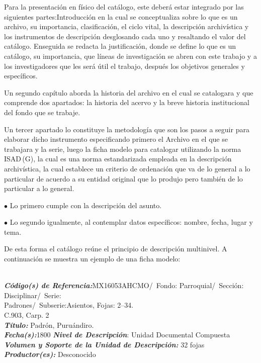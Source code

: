 Para la presentación en físico del catálogo, este deberá estar 
integrado por las siguientes partes:Introducción en la cual se 
conceptualiza sobre lo que es un archivo, su importancia, 
clasificación, el ciclo vital, la descripción archivística y los 
instrumentos de descripción desglosando cada uno y resaltando el valor 
del catálogo. Enseguida se redacta la justificación, donde se define lo 
que es un catálogo, su importancia, que líneas de investigación se 
abren con este trabajo y a los investigadores que les será útil el 
trabajo, después los objetivos generales y específicos.

\enlargethispage{1\baselineskip}
Un segundo capítulo aborda la historia del archivo en el cual se 
catalogara y que comprende dos apartados: la historia del 
acervo y la breve historia institucional del fondo que se trabaje.

Un tercer apartado lo constituye la metodología que son los pasos a 
seguir para elaborar dicho instrumento especificando primero el Archivo 
en el que se trabajara y la serie, luego la ficha modelo para catalogar 
utilizando la norma ISAD\,(G), la cual es una norma estandarizada empleada 
en la descripción archivística, la cual establece un criterio de 
ordenación que va de lo general a lo particular de acuerdo a su entidad 
original que lo produjo pero también de lo particular a lo general. 

\begin{Obs}
\item[$\bullet$]{Lo primero cumple con la descripción del asunto.}
\item[$\bullet$]{Lo segundo igualmente, al contemplar datos específicos: nombre, 
fecha, lugar y tema.}
\end{Obs}

De esta forma el catálogo reúne el principio de descripción multinivel. 
A continuación se muestra un ejemplo de una ficha modelo:

\bigskip
\begin{footnotesize}
\begin{mdframed}
\\
{\bfseries\textit{Código(s) de Referencia:}}MX16053AHCMO\slash\ Fondo:
Parroquial\slash\ Sección: Disciplinar\slash\ Serie:\\ Padrones\slash\ Subserie:Asientos, Fojas: 2--34.\\
C.903, Carp. 2\\
{\bfseries \textit{Título:}} Padrón, Puruándiro.\\
{\bfseries\textit{Fecha(s):}}1800
{\bfseries \textit{Nivel de Descripción}}: Unidad Documental Compuesta\\
{\bfseries\textit{Volumen y Soporte de la Unidad de Descripción:}} 32
fojas\\
{\bfseries\textit{Productor(es):}} Desconocido
\end{mdframed}
\end{footnotesize}

